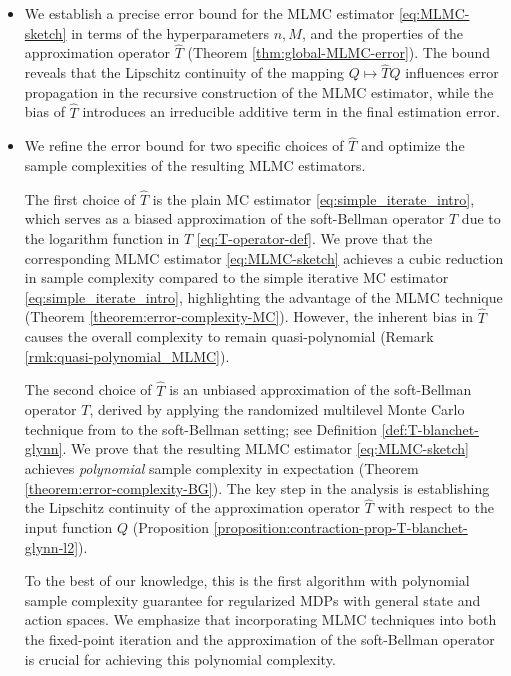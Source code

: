 \documentclass[11pt]{article}
\numberwithin{equation}{section}
\theoremstyle{definition}
\theoremstyle{remark}
\newcommand{\citet}{\cite}
\begin{document}
\begin{itemize}
    \item 
    We establish a precise error bound for the MLMC estimator \eqref{eq:MLMC-sketch} in terms of the hyperparameters $n, M$, and the properties of
    the approximation  operator $\hat T$ (Theorem \ref{thm:global-MLMC-error}). The bound reveals that the Lipschitz continuity of the mapping $Q \mapsto \hat{T} Q$  influences error propagation in the recursive construction of the MLMC estimator, while the bias of $\hat T$ introduces an irreducible additive term in the final estimation error.
\item 

We refine the error bound for two specific choices of $\hat T$  and optimize the sample complexities of the resulting MLMC estimators.
   

The first choice of $\hat T$ is  the plain MC estimator \eqref{eq:simple_iterate_intro}, which serves as a biased approximation of the soft-Bellman operator   $T$ due to the   logarithm function in $T$ \eqref{eq:T-operator-def}. 
We prove that the corresponding  MLMC estimator \eqref{eq:MLMC-sketch}
  achieves a cubic reduction in sample complexity compared to the simple iterative MC estimator \eqref{eq:simple_iterate_intro}, 
  highlighting the advantage of the MLMC technique
  (Theorem \ref{theorem:error-complexity-MC}). 
  However, the  inherent bias in $\hat T$ causes the overall complexity to remain quasi-polynomial (Remark \ref{rmk:quasi-polynomial_MLMC}).
  
The second choice of $\hat{T}$  is an unbiased approximation of the soft-Bellman operator $T$, derived by applying the randomized multilevel Monte Carlo technique from \citet{blanchet2015unbiased} to the soft-Bellman setting; see Definition \ref{def:T-blanchet-glynn}.
We prove that the resulting MLMC estimator \eqref{eq:MLMC-sketch} achieves \emph{polynomial} sample complexity in expectation (Theorem \ref{theorem:error-complexity-BG}). The key step in the analysis   is establishing the Lipschitz continuity of the approximation operator $\hat T$ with respect to the input function $Q$ (Proposition \ref{proposition:contraction-prop-T-blanchet-glynn-l2}).

To the best of our knowledge, this is the first algorithm with polynomial sample complexity guarantee  for regularized MDPs with general state and action spaces. We emphasize that incorporating MLMC techniques into both the fixed-point iteration and the approximation of the soft-Bellman operator is crucial for achieving this polynomial complexity.
  

\end{itemize}
\end{document}
